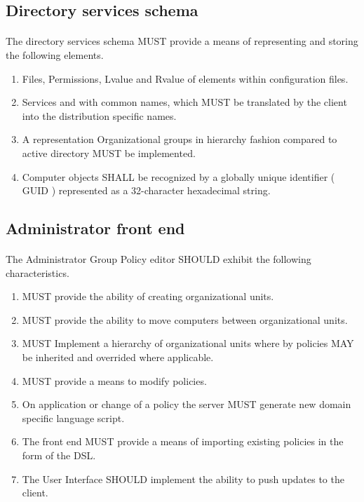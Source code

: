 			\subsection{Directory services schema}	
				\vspace{1cm}
				\paragraph{}
				The directory services schema MUST provide a means of representing and storing the following elements.

					\begin{enumerate}
						\item 	Files, Permissions, Lvalue and Rvalue of elements within configuration files.
						\item 	Services and with common names, which MUST be translated by the client into the distribution specific names.
						\item 	A representation Organizational groups in hierarchy fashion compared to active directory MUST be implemented.
						\item 	Computer objects SHALL be recognized by a globally unique identifier ( GUID ) represented as a 32-character hexadecimal string. 
					\end{enumerate}

			\subsection{Administrator front end}
				\vspace{1cm}
				\paragraph{}
				The Administrator Group Policy editor SHOULD exhibit the following characteristics. 

					\begin{enumerate}
						\item 	MUST provide the ability of creating organizational units.
						\item 	MUST provide the ability to move computers between organizational units.
						\item 	MUST Implement a hierarchy of organizational units where by policies MAY be inherited and overrided where applicable.
						\item 	MUST provide a means to modify policies.
						\item 	On application or change of a policy the server MUST generate new domain specific language script.
						\item 	The front end MUST provide a means of importing existing policies in the form of the DSL.
						\item 	The User Interface SHOULD implement the ability to push updates to the client.
					\end{enumerate}